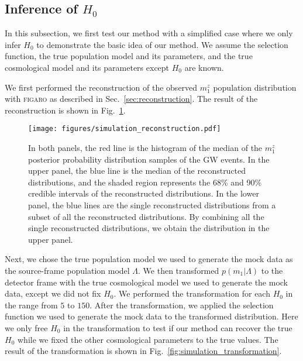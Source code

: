 \documentclass[twocolumn]{aastex631}
\begin{document}
\subsection{Inference of $H_0$}
\label{sec:inference_H0}

In this subsection, we first test our method with a simplified case where we only infer $H_0$ to demonstrate the basic idea of our method.
We assume the selection function, the true population model and its parameters, and the true cosmological model and its parameters except $H_0$ are known.

We first performed the reconstruction of the observed $m^z_1$ population distribution with \textsc{figaro} as described in Sec.~\ref{sec:reconstruction}.
The result of the reconstruction is shown in Fig.~\ref{fig:simulation_reconstruction}.

\begin{figure}[h]
    \texttt{[image: figures/simulation\_reconstruction.pdf]}
    \caption{
        In both panels, the red line is the histogram of the median of the $m^z_1$ posterior probability distribution samples of the \ac{GW} events.
        In the upper panel, the blue line is the median of the reconstructed distributions, and the shaded region represents the 68\% and 90\% credible intervals of the reconstructed distributions.
        In the lower panel, the blue lines are the single reconstructed distributions from a subset of all the reconstructed distributions.
        By combining all the single reconstructed distributions, we obtain the distribution in the upper panel.
    }
    \label{fig:simulation_reconstruction}
\end{figure}

Next, we chose the true population model we used to generate the mock data as the source-frame population model $\Lambda$.
We then transformed $p(m_1|\Lambda)$ to the detector frame with the true cosmological model we used to generate the mock data, except we did not fix $H_0$.
We performed the transformation for each $H_0$ in the range from $5$ to $150$.
After the transformation, we applied the selection function we used to generate the mock data to the transformed distribution.
Here we only free $H_0$ in the transformation to test if our method can recover the true $H_0$ while we fixed the other cosmological parameters to the true values.
The result of the transformation is shown in Fig.~\ref{fig:simulation_transformation}.
\end{document}
